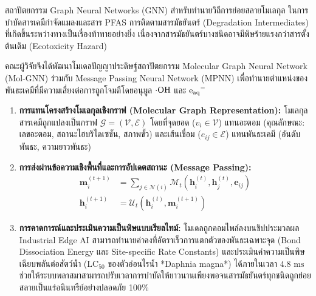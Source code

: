 \begin{aibox}{สถาปัตยกรรม Graph Neural Networks (GNN) สำหรับทำนายวิถีการย่อยสลายโมเลกุล}
ในการบำบัดสารเคมีกำจัดแมลงและสาร PFAS การติดตามสารมัธยันตร์ (Degradation Intermediates) ที่เกิดขึ้นระหว่างทางเป็นเรื่องท้าทายอย่างยิ่ง เนื่องจากสารมัธยันตร์บางชนิดอาจมีพิษร้ายแรงกว่าสารตั้งต้นเดิม (Ecotoxicity Hazard)

คณะผู้วิจัยจึงได้พัฒนาโมเดลปัญญาประดิษฐ์สถาปัตยกรรม Molecular Graph Neural Network (Mol-GNN) ร่วมกับ Message Passing Neural Network (MPNN) เพื่อทำนายตำแหน่งของพันธะเคมีที่มีความเสี่ยงต่อการถูกโจมตีโดยอนุมูล $\cdot\ce{OH}$ และ $\ce{e_{aq}^-}$

\begin{enumerate}
    \item \textbf{การแทนโครงสร้างโมเลกุลเชิงกราฟ (Molecular Graph Representation):}
    โมเลกุลสารเคมีถูกแปลงเป็นกราฟ $\mathcal{G} = (\mathcal{V}, \mathcal{E})$ โดยที่จุดยอด ($v_i \in \mathcal{V}$) แทนอะตอม (คุณลักษณะ: เลขอะตอม, สถานะไฮบริไดเซชัน, สภาพขั้ว) และเส้นเชื่อม ($e_{ij} \in \mathcal{E}$) แทนพันธะเคมี (อันดับพันธะ, ความยาวพันธะ)
    
    \item \textbf{การส่งผ่านข้อความเชิงพื้นที่และการอัปเดตสถานะ (Message Passing):}
    \begin{align}
        \mathbf{m}_i^{(t+1)} &= \sum_{j \in \mathcal{N}(i)} \mathcal{M}_t \left( \mathbf{h}_i^{(t)}, \mathbf{h}_j^{(t)}, \mathbf{e}_{ij} \right) \\
        \mathbf{h}_i^{(t+1)} &= \mathcal{U}_t \left( \mathbf{h}_i^{(t)}, \mathbf{m}_i^{(t+1)} \right)
    \end{align}
    
    \item \textbf{การคาดการณ์และประเมินความเป็นพิษแบบเรียลไทม์:}
    โมเดลถูกคอมไพล์ลงบนชิปประมวลผล Industrial Edge AI สามารถทำนายค่าคงที่อัตราเร็วการแตกตัวของพันธะเฉพาะจุด (Bond Dissociation Energy และ Site-specific Rate Constants) และประเมินค่าความเป็นพิษเฉียบพลันต่อสัตว์น้ำ ($\text{LC}_{50}$ ของตัวอ่อนไรน้ำ *Daphnia magna*) ได้ภายในเวลา $4.8 \text{ ms}$ ช่วยให้ระบบพลาสมาสามารถปรับเวลาการบำบัดให้ยาวนานเพียงพอจนสารมัธยันตร์ทุกชนิดถูกย่อยสลายเป็นแร่อนินทรีย์อย่างปลอดภัย 100\%
\end{enumerate}
\end{aibox}

